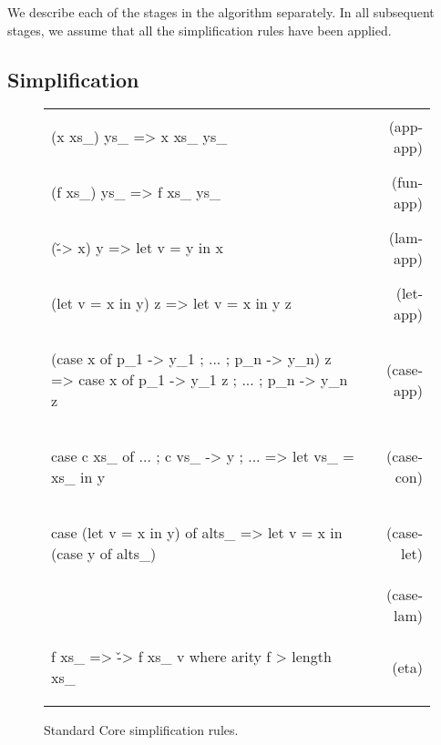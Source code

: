 \documentclass[preprint]{sigplanconf}
\newcommand{\simp}[2]{\vspace{-7mm} #2 & (#1) \\}
\newenvironment{simplify}
    {\noindent
     \begin{flushright}
     \begin{tabular}{p{6.5cm}r}
    }
    {\end{tabular}
     \vspace{-7mm}
     \end{flushright}
    }
\begin{document}
We describe each of the stages in the algorithm separately. In all subsequent stages, we assume that all the simplification rules have been applied.


\subsection{Simplification}

\begin{figure}
\begin{simplify}

\simp{app-app}{
\begin{code}
(x xs_) ys_
    => x xs_ ys_
\end{code}}

\simp{fun-app}{
\begin{code}
(f xs_) ys_
    => f xs_ ys_
\end{code}}

\simp{lam-app}{
\begin{code}
(\v -> x) y
    => let v = y in x
\end{code}}

\simp{let-app}{
\begin{code}
(let v = x in y) z
    => let v = x in y z
\end{code}}

\simp{case-app}{
\begin{code}
(case x of {p_1 -> y_1 ; ... ; p_n -> y_n}) z
    => case x of {p_1 -> y_1 z ; ... ; p_n -> y_n z}
\end{code}}

\simp{case-con}{
\begin{code}
case c xs_ of {... ; c vs_ -> y ; ...}
    => let vs_ = xs_ in y
\end{code}}

\simp{case-let}{
\begin{code}
case (let v = x in y) of alts_
    => let v = x in (case y of alts_)
\end{code}}

\simp{case-case}{
\begin{code}
case (case x of {... ; c vs_ -> y ; ...) of alts_
    => case x of {... ; c vs_ -> case y of alts_ ; ...}
\end{code}}

\simp{case-lam}{
\begin{code}
case x of {... ; c vs_ -> \v -> y ; ...}
    => \z -> case x of {... ; c vs_ -> (\v -> y) z ; ...} z
\end{code}}

\simp{eta}{
\begin{code}
f xs_
    => \v -> f xs_ v
    where arity f > length xs_
\end{code}}

\end{simplify}
\caption{Standard Core simplification rules.}
\label{fig:simplify}
\end{figure}
\end{document}
